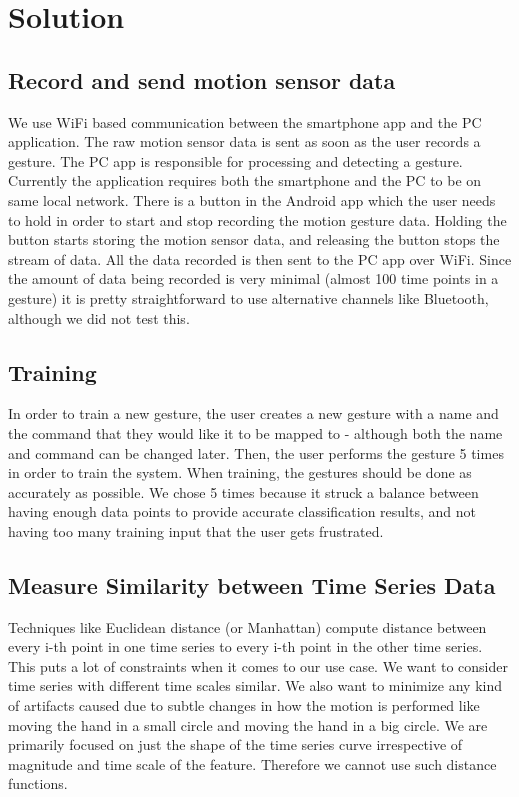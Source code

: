 \documentclass{sigchi}
\begin{document}
\section{Solution}
\subsection{Record and send motion sensor data}

We use WiFi based communication between the smartphone app and the PC application. The raw motion sensor data is sent as soon as the user records a gesture. The PC app is responsible for processing and detecting a gesture. Currently the application requires both the smartphone and the PC to be on same local network. There is a button in the Android app which the user needs to hold in order to start and stop recording the motion gesture data. Holding the button starts storing the motion sensor data, and releasing the button stops the stream of data. All the data recorded is then sent to the PC app over WiFi. Since the amount of data being recorded is very minimal (almost 100 time points in a gesture) it is pretty straightforward to use alternative channels like Bluetooth, although we did not test this.

\subsection{Training}

In order to train a new gesture, the user creates a new gesture with a name and the command that they would like it to be mapped to - although both the name and command can be changed later. Then, the user performs the gesture 5 times in order to train the system. When training, the gestures should be done as accurately as possible. We chose 5 times because it struck a balance between having enough data points to provide accurate classification results, and not having too many training input that the user gets frustrated.

\subsection{Measure Similarity between Time Series Data}

Techniques like Euclidean distance (or Manhattan) compute distance between every i-th point in one time series to every i-th point in the other time series. This puts a lot of constraints when it comes to our use case. We want to consider time series with different time scales similar. We also want to minimize any kind of artifacts caused due to subtle changes in how the motion is performed like moving the hand in a small circle and moving the hand in a big circle. We are primarily focused on just the shape of the time series curve irrespective of magnitude and time scale of the feature. Therefore we cannot use such distance functions.
\end{document}
